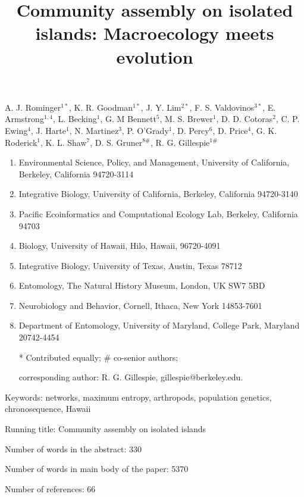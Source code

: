 \documentclass[12pt]{article}
\title{\vspace{-1em}Community assembly on isolated islands:
  Macroecology meets evolution}
\author{}
\date{}
\begin{document}
\baselineskip24pt
\maketitle 

\vspace{-4em}

A. J. Rominger$^{1*}$,
K. R. Goodman$^{1*}$, 
J. Y. Lim$^{2*}$, 
F. S. Valdovinos$^{3*}$, 
E. Armstrong$^{1, 4}$,
L. Becking$^1$,
G. M Bennett$^5$,
M. S. Brewer$^1$, 
D. D. Cotoras$^2$, 
C. P. Ewing$^4$, 
J. Harte$^1$,
N. Martinez$^3$,
P. O'Grady$^1$,
D. Percy$^6$,
D. Price$^4$,
G. K. Roderick$^1$,
K. L. Shaw$^7$,
D. S. Gruner$^{8\#}$,
R. G. Gillespie$^{1\#}$

\begin{enumerate}
\item Environmental Science, Policy, and Management, University of
  California, Berkeley, California 94720-3114
\item Integrative Biology, University of California, Berkeley,
  California 94720-3140
\item Pacific Ecoinformatics and Computational Ecology Lab, Berkeley,
  California 94703
\item Biology, University of Hawaii, Hilo, Hawaii, 96720-4091
\item Integrative Biology, University of Texas, Austin, Texas 78712
\item Entomology, The Natural History Museum, London, UK SW7 5BD
\item Neurobiology and Behavior, Cornell, Ithaca, New York 14853-7601
\item Department of Entomology, University of Maryland, College Park,
  Maryland 20742-4454
\item[*] Contributed equally; \# co-senior authors; 
\item[] corresponding author: R. G. Gillespie, gillespie@berkeley.edu.
\end{enumerate}


\vspace{2em}

\noindent
Keywords: networks, maximum entropy, arthropods, population genetics,
chronosequence, Hawaii

\noindent
Running title: Community assembly on isolated islands

\noindent
Number of words in the abstract: 330

\noindent
Number of words in main body of the paper: 5370

\noindent
Number of references: 66
\end{document}
